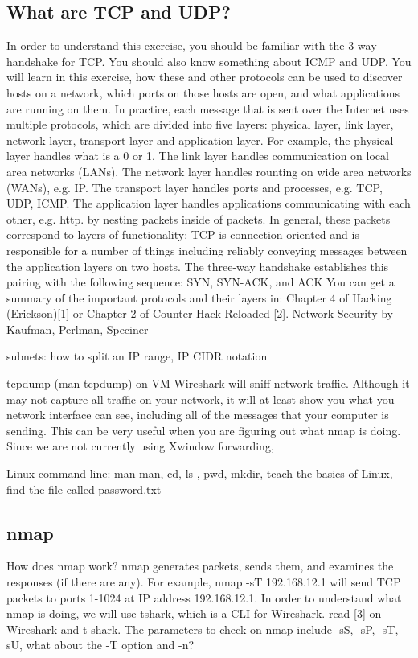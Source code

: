 \documentclass[11pt]{report}
\begin{document}
\subsection{ What are TCP and UDP?  }
In order to understand this exercise, you should be familiar with the 3-way handshake for TCP.
You should also know something about ICMP and UDP.
You will learn in this exercise, how these and other protocols can be used to discover hosts on a network,
which ports on those hosts are open, and what applications are running on them.
In practice, each message that is sent over the Internet 
uses multiple protocols, which are divided into five layers: physical layer, link layer, network layer,
transport layer and application layer.
For example, the physical layer handles what is a 0 or 1.
The link layer handles communication on local area networks (LANs).
The network layer handles rounting on wide area networks (WANs), e.g. IP.
The transport layer handles ports and processes, e.g. TCP, UDP, ICMP.
The application layer handles applications communicating with each other, e.g. http.
by nesting packets inside of packets.  In general,
these packets correspond to layers  of functionality:   
TCP is connection-oriented and is responsible for 
a number of things including reliably conveying messages between the application layers on two hosts.  
The three-way handshake establishes this pairing with the following sequence: SYN, SYN-ACK,  and ACK
You can get a summary of the important protocols and their layers in:
Chapter 4 of Hacking (Erickson)[1] or Chapter 2 of Counter Hack Reloaded [2].  
Network Security by Kaufman, Perlman, Speciner

subnets: how to split an IP range, IP CIDR notation

tcpdump (man tcpdump) on VM
Wireshark will sniff network traffic.  Although it may not capture 
all traffic on your network, it will at least show you what you network interface can see,
including all of the messages that your computer is sending.  
This can be very useful when you are figuring out what nmap is doing.  Since we are not
currently using Xwindow forwarding, 


Linux command line: man man, cd, ls , pwd, mkdir, 
teach the basics of Linux, find the file called password.txt

\subsection{nmap}
 How does nmap work?
nmap generates packets, sends them, and examines the responses (if there are any).
For example, nmap -sT 192.168.12.1  will send TCP packets to ports 1-1024 at IP address 192.168.12.1.
In order to understand what nmap is doing, we will use tshark, which is a CLI for Wireshark.
read [3] on Wireshark and t-shark.  The parameters to check on nmap include 
-sS, -sP, -sT, -sU, what about the -T option and -n?
\end{document}
